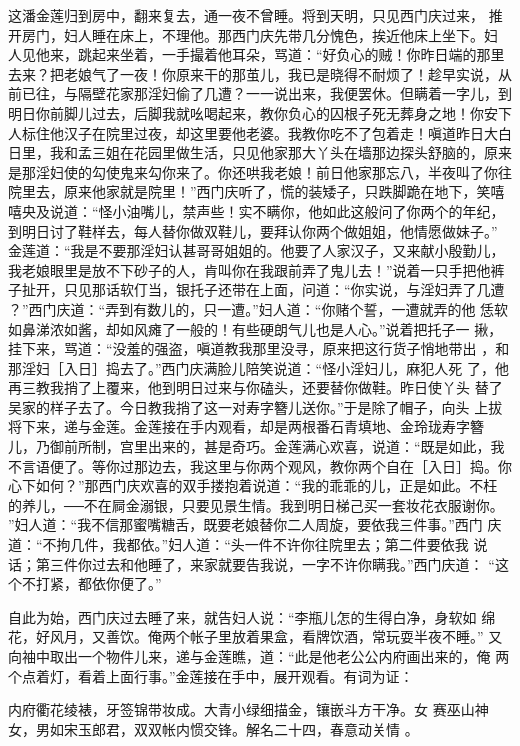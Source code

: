 这潘金莲归到房中，翻来复去，通一夜不曾睡。将到天明，只见西门庆过来，
推开房门，妇人睡在床上，不理他。那西门庆先带几分愧色，挨近他床上坐下。妇
人见他来，跳起来坐着，一手撮着他耳朵，骂道：“好负心的贼！你昨日端的那里
去来？把老娘气了一夜！你原来干的那茧儿，我已是晓得不耐烦了！趁早实说，从
前已往，与隔壁花家那淫妇偷了几遭？一一说出来，我便罢休。但瞒着一字儿，到
明日你前脚儿过去，后脚我就吆喝起来，教你负心的囚根子死无葬身之地！你安下
人标住他汉子在院里过夜，却这里要他老婆。我教你吃不了包着走！嗔道昨日大白
日里，我和孟三姐在花园里做生活，只见他家那大丫头在墙那边探头舒脑的，原来
是那淫妇使的勾使鬼来勾你来了。你还哄我老娘！前日他家那忘八，半夜叫了你往
院里去，原来他家就是院里！”西门庆听了，慌的装矮子，只跌脚跪在地下，笑嘻
嘻央及说道：“怪小油嘴儿，禁声些！实不瞒你，他如此这般问了你两个的年纪，
到明日讨了鞋样去，每人替你做双鞋儿，要拜认你两个做姐姐，他情愿做妹子。”
金莲道：“我是不要那淫妇认甚哥哥姐姐的。他要了人家汉子，又来献小殷勤儿，
我老娘眼里是放不下砂子的人，肯叫你在我跟前弄了鬼儿去！”说着一只手把他裤
子扯开，只见那话软仃当，银托子还带在上面，问道：“你实说，与淫妇弄了几遭
？”西门庆道：“弄到有数儿的，只一遭。”妇人道：“你赌个誓，一遭就弄的他
恁软如鼻涕浓如酱，却如风瘫了一般的！有些硬朗气儿也是人心。”说着把托子一
揪，挂下来，骂道：“没羞的强盗，嗔道教我那里没寻，原来把这行货子悄地带出
，和那淫妇［入日］捣去了。”西门庆满脸儿陪笑说道：“怪小淫妇儿，麻犯人死
了，他再三教我捎了上覆来，他到明日过来与你磕头，还要替你做鞋。昨日使丫头
替了吴家的样子去了。今日教我捎了这一对寿字簪儿送你。”于是除了帽子，向头
上拔将下来，递与金莲。金莲接在手内观看，却是两根番石青填地、金玲珑寿字簪
儿，乃御前所制，宫里出来的，甚是奇巧。金莲满心欢喜，说道：“既是如此，我
不言语便了。等你过那边去，我这里与你两个观风，教你两个自在［入日］捣。你
心下如何？”那西门庆欢喜的双手搂抱着说道：“我的乖乖的儿，正是如此。不枉
的养儿，──不在屙金溺银，只要见景生情。我到明日梯己买一套妆花衣服谢你。
”妇人道：“我不信那蜜嘴糖舌，既要老娘替你二人周旋，要依我三件事。”西门
庆道：“不拘几件，我都依。”妇人道：“头一件不许你往院里去；第二件要依我
说话；第三件你过去和他睡了，来家就要告我说，一字不许你瞒我。”西门庆道：
“这个不打紧，都依你便了。”

自此为始，西门庆过去睡了来，就告妇人说：“李瓶儿怎的生得白净，身软如
绵花，好风月，又善饮。俺两个帐子里放着果盒，看牌饮酒，常玩耍半夜不睡。”
又向袖中取出一个物件儿来，递与金莲瞧，道：“此是他老公公内府画出来的，俺
两个点着灯，看着上面行事。”金莲接在手中，展开观看。有词为证：

内府衢花绫裱，牙签锦带妆成。大青小绿细描金，镶嵌斗方干净。女
赛巫山神女，男如宋玉郎君，双双帐内惯交锋。解名二十四，春意动关情
。

